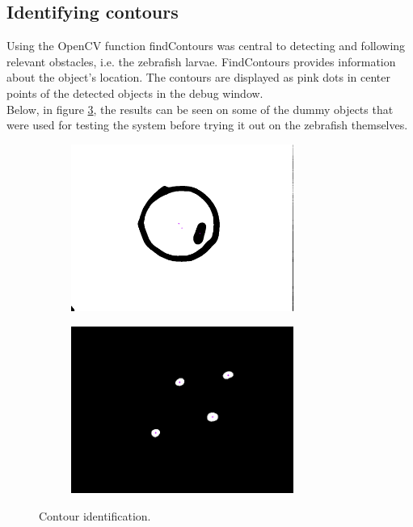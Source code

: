 \documentclass[10pt,a4paper, singlespace]{article}
\begin{document}
\subsection{Identifying contours}
Using the OpenCV function findContours was central to detecting and following relevant obstacles, i.e. the zebrafish larvae. FindContours provides information about the object's location. The contours are displayed as pink dots in center points of the detected objects in the debug window.\\
Below, in figure \ref{fig:contours}, the results can be seen on some of the dummy objects that were used for testing the system before trying it out on the zebrafish themselves.\\

\begin{figure}[H]
	\centering
	\begin{subfigure}[b]{0.5\textwidth}
		\includegraphics[width=0.8\textwidth]{contour_centers.png}
		\label{fig:unfiltered}
	\end{subfigure}\hfill
	\begin{subfigure}[b]{0.5\textwidth}	
		\includegraphics[width=0.8\textwidth]{contour_detection.png}
		\label{fig:gaussian}
	\end{subfigure}\hfill
	\caption{Contour identification.}
	\label{fig:contours}
\end{figure} 
\end{document}
